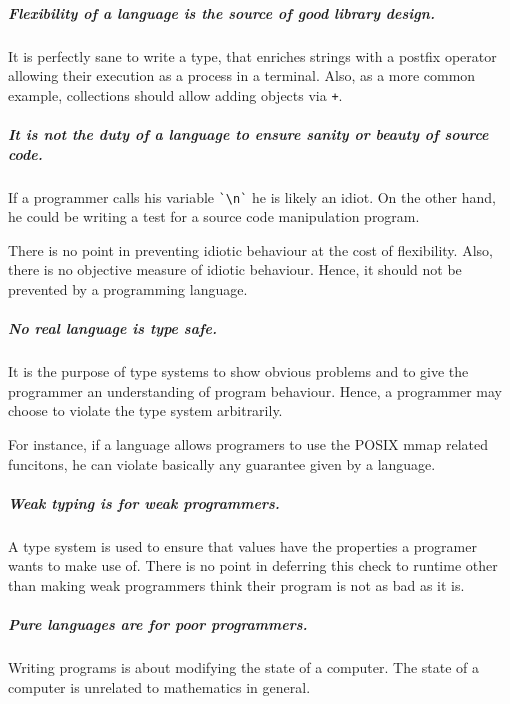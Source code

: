 \subparagraph{Flexibility of a language is the source of good library design.}

It is perfectly sane to write a type, that enriches strings with a postfix operator allowing their execution as a process in a terminal.
Also, as a more common example, collections should allow adding objects via \texttt{+}.


\subparagraph{It is not the duty of a language to ensure sanity or beauty of source code.}

If a programmer calls his variable \verb|`\n`| he is likely an idiot.
On the other hand, he could be writing a test for a source code manipulation program.

There is no point in preventing idiotic behaviour at the cost of flexibility.
Also, there is no objective measure of idiotic behaviour.
Hence, it should not be prevented by a programming language.


\subparagraph{No real language is type safe.}

It is the purpose of type systems to show obvious problems and to give the programmer an understanding of program behaviour.
Hence, a programmer may choose to violate the type system arbitrarily.

For instance, if a language allows programers to use the POSIX mmap related funcitons, he can violate basically any guarantee given by a language.


\subparagraph{Weak typing is for weak programmers.}

A type system is used to ensure that values have the properties a programer wants to make use of.
There is no point in deferring this check to runtime other than making weak programmers think their program is not as bad as it is.


\subparagraph{Pure languages are for poor programmers.}

Writing programs is about modifying the state of a computer.
The state of a computer is unrelated to mathematics in general.